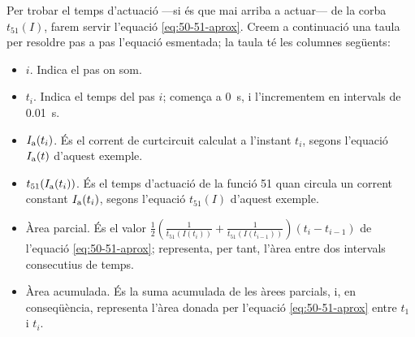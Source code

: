 \begin{exemple}
	Per trobar el temps d'actuació ---si és que mai arriba a actuar--- de la corba $t_{51}(I)$, farem servir l'equació \eqref{eq:50-51-aprox}.  	Creem a continuació una taula per resoldre pas a pas l'equació esmentada; la taula té les columnes següents:
	\begin{itemize}
		\item $i$. Indica el pas on som.
		\item $t_i$. Indica el temps del pas $i$; comença a \qty{0}{s}, i l'incrementem en intervals de  \qty{0,01}{s}.
		\item  $I_\mathrm{a}(t_i)$. És el corrent de curtcircuit calculat a l'instant $t_i$, segons l'equació $I_\mathrm{a}(t)$ d'aquest exemple.
		\item $t_{51}(I_\mathrm{a}(t_i))$. És el temps d'actuació de la funció 51 quan circula un corrent constant $I_\mathrm{a}(t_i)$, segons l'equació $t_{51}(I)$ d'aquest exemple.
		\item Àrea parcial. És el valor $\frac{1}{2} \left( \frac{1}{t_{51}(I(t_i))} + \frac{1}{t_{51}(I(t_{i-1}))} \right) (t_i - t_{i-1})$ de l'equació \eqref{eq:50-51-aprox}; representa, per tant, l'àrea entre dos intervals consecutius de temps.
		\item Àrea acumulada. És la suma acumulada de les àrees parcials, i, en conseqüència, representa l'àrea donada per l'equació \eqref{eq:50-51-aprox} entre $t_1$ i $t_i$.
	\end{itemize}
	

\end{exemple}

